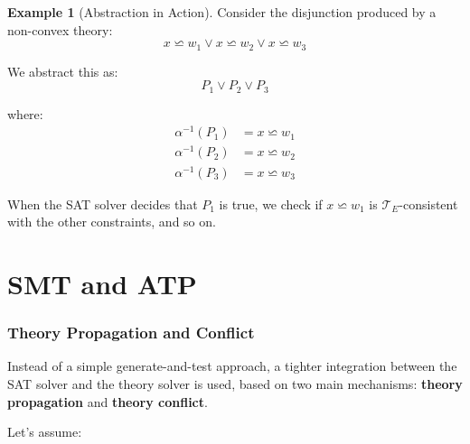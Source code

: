 \documentclass[11pt,a4paper]{article}
\theoremstyle{definition}
\newtheorem{example}{Example}[section]
\theoremstyle{plain}
\theoremstyle{remark}
\begin{document}
\begin{example}[Abstraction in Action]

Consider the disjunction produced by a non-convex theory:
\[
x \backsimeq w_1 \vee x \backsimeq w_2 \vee x \backsimeq w_3
\]

We abstract this as:
\[
P_1 \vee P_2 \vee P_3
\]

where:
\begin{align*}
\alpha^{-1}(P_1) &= x \backsimeq w_1 \\
\alpha^{-1}(P_2) &= x \backsimeq w_2 \\
\alpha^{-1}(P_3) &= x \backsimeq w_3
\end{align*}



When the SAT solver decides that $P_1$ is true, we check if $x \backsimeq w_1$ is $\mathcal{T}_E$-consistent with the other constraints, and so on.

\end{example}



\newpage



\part{SMT and ATP}



\section{Theory Propagation and Conflict}



Instead of a simple generate-and-test approach, a tighter integration between the SAT solver and the theory solver is used, based on two main mechanisms: \textbf{theory propagation} and \textbf{theory conflict}.



Let's assume:

\begin{center}


\end{center}
\end{document}
